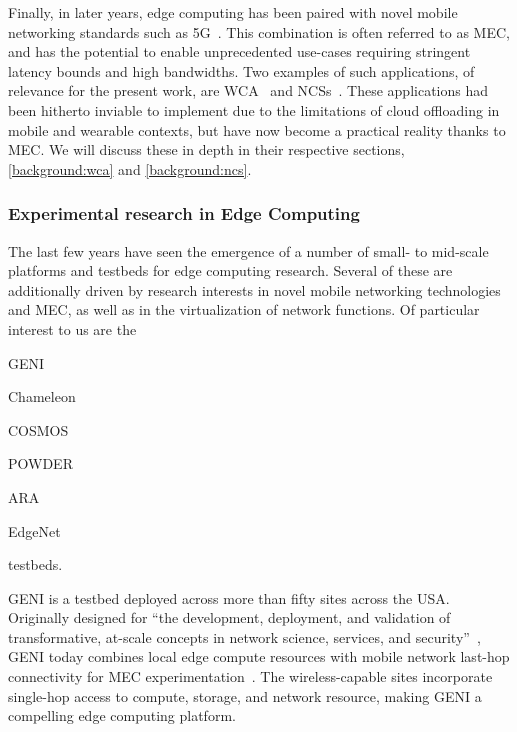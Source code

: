 Finally, in later years, edge computing has been paired with novel mobile networking standards such as 5G~\cite{hassan2019edge,pham2020survey,wan2020efficient}.
This combination is often referred to as \gls{MEC}, and has the potential to enable unprecedented use-cases requiring stringent latency bounds and high bandwidths.
Two examples of such applications, of relevance for the present work, are \acl{WCA}~\cite{ha2014towards,chen2018application,wang2020scaling,chen2017empirical,chen2018application} and \aclp{NCS}~\cite{sasaki2016vehicle,wang2018bandwidth,wan2020efficient}.
These applications had been hitherto inviable to implement due to the limitations of cloud offloading in mobile and wearable contexts, but have now become a practical reality thanks to \gls{MEC}.
We will discuss these in depth in their respective sections, \cref{background:wca} and \cref{background:ncs}.

\subsubsection{Experimental research in Edge Computing}

The last few years have seen the emergence of a number of small- to mid-scale platforms and testbeds for edge computing research.
Several of these are additionally driven by research interests in novel mobile networking technologies and \gls{MEC}, as well as in the virtualization of network functions.
Of particular interest to us are the
\begin{inlineenum}
    \item \acs{GENI}
    \item Chameleon
    \item \acs{COSMOS}
    \item \acs{POWDER}
    \item \acs{ARA}
    \item EdgeNet
\end{inlineenum} testbeds.

\gls{GENI} is a testbed deployed across more than fifty sites across the \gls{USA}.
Originally designed for ``the development, deployment, and validation of transformative, at-scale concepts in network science, services, and security''~\cite{berman2014geni}, \gls{GENI} today combines local edge compute resources with mobile network last-hop connectivity for \gls{MEC} experimentation~\cite{gosain2017geni}.
The wireless-capable sites incorporate single-hop access to compute, storage, and network resource, making \gls{GENI} a compelling edge computing platform.

